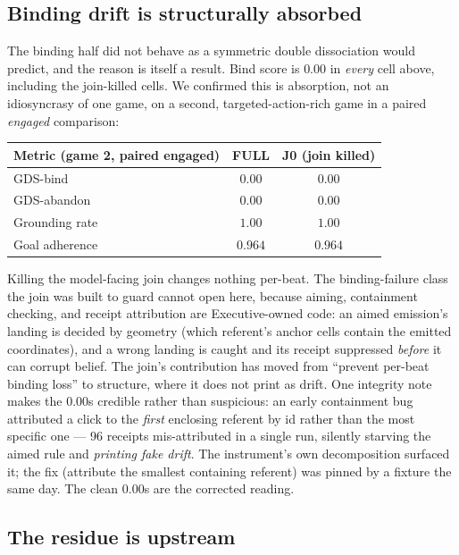 \documentclass{article}
\begin{document}
\subsection{Binding drift is structurally absorbed}
\label{sec:absorb}

The binding half did not behave as a symmetric double dissociation would predict,
and the reason is itself a result. Bind score is $0.00$ in \emph{every} cell above,
including the join-killed cells. We confirmed this is absorption, not an idiosyncrasy
of one game, on a second, targeted-action-rich game in a paired \emph{engaged}
comparison:

\begin{table}[h]
\centering
\begin{tabular}{lcc}
\toprule
Metric (game 2, paired engaged) & FULL & J0 (join killed) \\
\midrule
GDS-bind        & $0.00$  & $0.00$  \\
GDS-abandon     & $0.00$  & $0.00$  \\
Grounding rate  & $1.00$  & $1.00$  \\
Goal adherence  & $0.964$ & $0.964$ \\
\bottomrule
\end{tabular}
\end{table}

\noindent Killing the model-facing join changes nothing per-beat. The
binding-failure class the join was built to guard cannot open here, because
aiming, containment checking, and receipt attribution are Executive-owned code:
an aimed emission's landing is decided by geometry (which referent's anchor cells
contain the emitted coordinates), and a wrong landing is caught and its receipt
suppressed \emph{before} it can corrupt belief. The join's contribution has moved
from ``prevent per-beat binding loss'' to structure, where it does not print as
drift. One integrity note makes the $0.00$s credible rather than suspicious: an
early containment bug attributed a click to the \emph{first} enclosing referent by
id rather than the most specific one --- 96 receipts mis-attributed in a single run,
silently starving the aimed rule and \emph{printing fake drift}. The instrument's
own decomposition surfaced it; the fix (attribute the smallest containing referent)
was pinned by a fixture the same day. The clean $0.00$s are the corrected reading.

\subsection{The residue is upstream}
\end{document}
